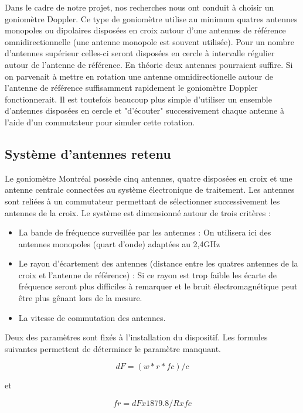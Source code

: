 	Dans le cadre de notre projet, nos recherches nous ont conduit à choisir un goniomètre Doppler. Ce type de goniomètre utilise au minimum quatres antennes monopoles ou dipolaires disposées en croix autour d'une antennes de référence omnidirectionnelle (une antenne monopole est souvent utilisée). Pour un nombre d'antennes supérieur celles-ci seront disposées en cercle à intervalle régulier autour de l'antenne de référence.
	En théorie deux antennes pourraient suffire. Si on parvenait à mettre en rotation une antenne omnidirectionelle autour de l'antenne de référence suffisamment rapidement le goniomètre Doppler fonctionnerait. Il est toutefois beaucoup plus simple d'utiliser un ensemble d'antennes disposées en cercle et "d'écouter" successivement chaque antenne à l'aide d'un commutateur pour simuler cette rotation.
	
\subsection{Système d'antennes retenu}

	Le goniomètre Montréal possède cinq antennes, quatre disposées en croix et une antenne centrale connectées au système électronique de traitement. Les antennes sont reliées à un commutateur permettant de sélectionner successivement les antennes de la croix. Le système est dimensionné autour de trois critères : 
	
\begin{itemize}

\item La bande de fréquence surveillée par les antennes : On utilisera ici des antennes monopoles (quart d'onde) adaptées au 2,4GHz

\item Le rayon d'écartement des antennes (distance entre les quatres antennes de la croix et l'antenne de référence) : Si ce rayon est trop faible les écarte de fréquence seront plus difficiles à remarquer et le bruit électromagnétique peut être plus gênant lors de la mesure.


\item La vitesse de commutation des antennes.

\end{itemize}

Deux des paramètres sont fixés à l'installation du dispositif. Les formules suivantes permettent de déterminer le paramètre manquant.

\begin{equation}

dF = (w*r*fc)/c

\end{equation}

et

\begin{equation}

fr = dF x 1879.8/R x fc

\end{equation}




